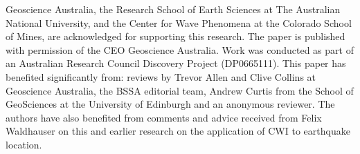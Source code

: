 \documentclass[12pt,double]{article}
\begin{document}
Geoscience Australia, the Research School of Earth Sciences at The
Australian National University, and the Center for Wave Phenomena at
the Colorado School of Mines, are acknowledged for supporting this
research. The paper is published with permission of the CEO
Geoscience Australia. Work was conducted as part of an Australian
Research Council Discovery Project (DP0665111).  This paper has
benefited significantly from: reviews by Trevor Allen and Clive Collins
at Geoscience Australia, the BSSA editorial team, Andrew Curtis from 
the School of GeoSciences at the University of Edinburgh and an anonymous 
reviewer. The authors have also benefited from comments and advice received from
Felix Waldhauser on this and earlier research on the application of
CWI to earthquake location.

\vspace{2em}


\newcommand{\areps}{\textit{Ann.\ Rev.\ Earth Planet\ Sci.}}
\newcommand{\bssa}{\textit{Bull.\ Seism.\ Soc.\ Am.}}
\newcommand{\eos}{\textit{Eos Trans.\ AGU}} 
\newcommand{\eps}{\textit{Earth~Planets~Space}}
\newcommand{\epsl}{\textit{Earth~Planet.\ Sci.\ Lett.}}
\newcommand{\gca}{\textit{Geochim.\ Cosmochim.\ Acta}}
\newcommand{\geo}{\textit{Geology}}
\newcommand{\geop}{\textit{Geophysics}}
\newcommand{\gji}{\textit{Geophys.\ J.\ Int.}}
\newcommand{\gjras}{\textit{Geophys.\ J.\ R.\ Astr.\ Soc.}}
\newcommand{\grl}{\textit{Geophys.\ Res.\ Lett.}}
\newcommand{\gsab}{\textit{Geol.\ Soc.\ Am.\ Bull.}}
\newcommand{\gs}{\textit{Geophys.\ Surv.}}
\newcommand{\jgr}{\textit{J.\ Geophys.\ Res.}}
\newcommand{\jpo}{\textit{J.\ Phys.\ Oceanogr.}} 
\newcommand{\jseis}{\textit{J.~Seismology}}
\newcommand{\mnras}{\textit{Mon.\ Not.\ R.\ astr.\ Soc.}} 
\newcommand{\pag}{\textit{Pure Appl.\ Geophys.}}
\newcommand{\pepi}{\textit{Phys.\ Earth Planet.\ Inter.}}
\newcommand{\rg}{\textit{Rev.\ Geophys.}}
\newcommand{\tecto}{\textit{Tectonophysics}}
\newcommand{\jpe}{\textit{J. Phys. Earth}}  %
\newcommand{\srl}{\textit{Seism. Res. Let.}}  %
\end{document}
